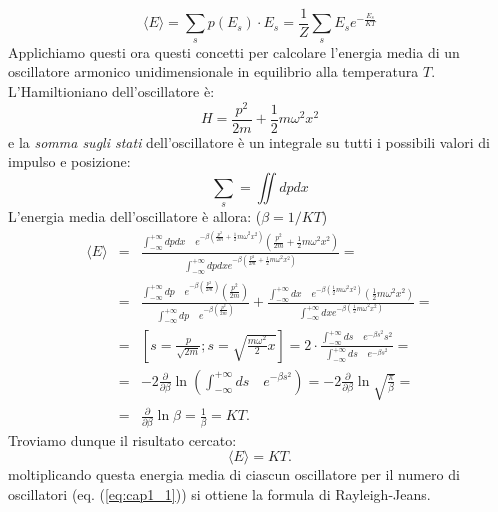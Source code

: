 \begin{equation}
\langle E \rangle = \sum _s p(E_s)\cdot E_s = \frac{1}{Z}\sum _s E_s e^{-\frac{E_s}{KT}}
\end{equation}
Applichiamo questi ora questi concetti per calcolare l'energia media di un oscillatore armonico unidimensionale in equilibrio alla temperatura $T$. L'Hamiltioniano dell'oscillatore è:
\begin{equation}
H= \frac{p^2}{2m}+\frac{1}{2}m \omega ^2 x^2
\end{equation}
e la \textit{somma sugli stati} dell'oscillatore è un integrale su tutti i possibili valori di impulso e posizione:
\begin{equation}
\sum _s = \iint dp dx
\end{equation}
L'energia media dell'oscillatore è allora: ($\beta = 1/KT$)
\begin{eqnarray}
\langle E \rangle &=& \frac{\int _{-\infty} ^{+\infty} dp dx \quad e^{-\beta \left( \frac{p^2}{2m}+\frac{1}{2}m \omega ^2x^2\right)}\left( \frac{p^2}{2m}+\frac{1}{2}m \omega ^2x^2\right)}{\int _{-\infty} ^{+\infty} dp dx e^{-\beta \left( \frac{p^2}{2m}+\frac{1}{2}m \omega ^2x^2\right)}}= \nonumber \\
&=&\frac{\int _{-\infty} ^{+\infty} dp \quad e^{-\beta \left( \frac{p^2}{2m}\right)}\left( \frac{p^2}{2m}\right)}{\int _{-\infty} ^{+\infty} dp \quad e^{-\beta \left( \frac{p^2}{2m}\right)}} + \frac{\int _{-\infty} ^{+\infty}  dx \quad e^{-\beta \left(\frac{1}{2}m \omega ^2x^2\right)}\left(\frac{1}{2}m \omega ^2x^2\right)}{\int _{-\infty} ^{+\infty} dx e^{-\beta \left( \frac{1}{2}m \omega ^2x^2\right)}}= \nonumber \\
&=& \left[ s=\frac{p}{\sqrt{2m}}; s= \sqrt{\frac{m \omega ^2}{2}x} \right]= 2\cdot \frac{\int _{-\infty} ^{+\infty}ds \quad e^{-\beta s^2}s^2}{\int _{-\infty} ^{+\infty}ds \quad e^{-\beta s^2}}= \nonumber \\
&=&-2 \frac{\partial}{\partial \beta} \ln \left(\int _{-\infty} ^{+\infty}ds \quad e^{-\beta s^2} \right) = -2\frac{\partial}{\partial \beta} \ln \sqrt{\frac{\pi}{\beta}}= \nonumber \\
&=& \frac{\partial}{\partial \beta} \ln \beta = \frac{1}{\beta}= KT. 
\end{eqnarray}
Troviamo dunque il risultato cercato:
\begin{equation}
\langle E \rangle = KT.
\label{eq:cap1_2}
\end{equation}
moltiplicando questa energia media di ciascun oscillatore per il numero di oscillatori (eq. (\ref{eq:cap1_1})) si ottiene la formula di Rayleigh-Jeans.\\
